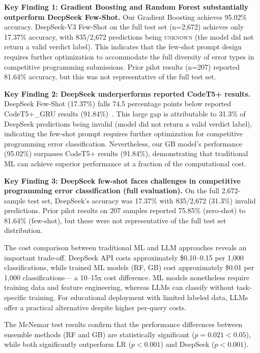 \documentclass[10pt,a4paper]{article}
\begin{document}
\textbf{Key Finding 1: Gradient Boosting and Random Forest substantially outperform DeepSeek Few-Shot.}
Our Gradient Boosting achieves 95.02\% accuracy. DeepSeek-V3 Few-Shot on the full test set (n=2,672) achieves only 17.37\% accuracy, with 835/2,672 predictions being \textsc{unknown} (the model did not return a valid verdict label). This indicates that the few-shot prompt design requires further optimization to accommodate the full diversity of error types in competitive programming submissions. Prior pilot results (n=207) reported 81.64\% accuracy, but this was not representative of the full test set.

\textbf{Key Finding 2: DeepSeek underperforms reported CodeT5+ results.}
DeepSeek Few-Shot (17.37\%) falls 74.5 percentage points below reported CodeT5+\_GRU results (91.84\%)~\cite{wang2023codet5plus}. This large gap is attributable to 31.3\% of DeepSeek predictions being invalid (model did not return a valid verdict label), indicating the few-shot prompt requires further optimization for competitive programming error classification. Nevertheless, our GB model's performance (95.02\%) surpasses CodeT5+ results (91.84\%), demonstrating that traditional ML can achieve superior performance at a fraction of the computational cost.

\textbf{Key Finding 3: DeepSeek few-shot faces challenges in competitive programming error classification (full evaluation).}
On the full 2,672-sample test set, DeepSeek's accuracy was 17.37\% with 835/2,672 (31.3\%) invalid predictions. Prior pilot results on 207 samples reported 75.85\% (zero-shot) to 81.64\% (few-shot), but these were not representative of the full test set distribution.

The cost comparison between traditional ML and LLM approaches reveals an important
trade-off. DeepSeek API costs approximately \$0.10--0.15 per 1,000 classifications,
while trained ML models (RF, GB) cost approximately \$0.01 per 1,000 classifications---
a 10--15x cost difference. ML models nonetheless require training data and feature engineering,
whereas LLMs can classify without task-specific training. For educational deployment with
limited labeled data, LLMs offer a practical alternative despite higher per-query costs.

The McNemar test results confirm that the performance differences between ensemble
methods (RF and GB) are statistically significant ($p = 0.021 < 0.05$), while both
significantly outperform LR ($p < 0.001$) and DeepSeek ($p < 0.001$).
\end{document}
